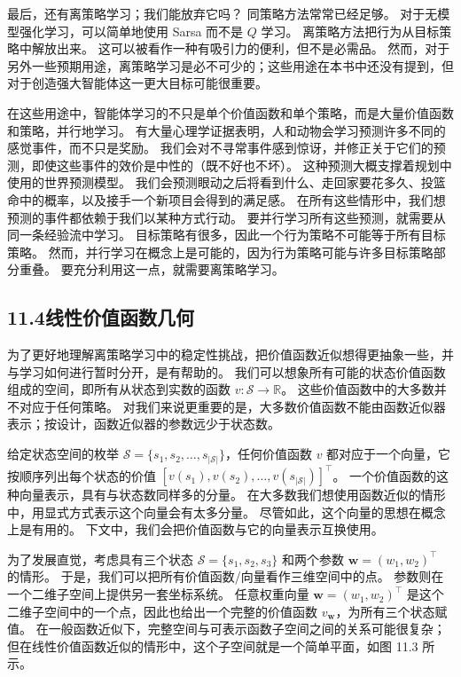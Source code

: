 \documentclass[UTF8,12pt,a4paper,fontset=fandol]{ctexart}
\begin{document}
最后，还有离策略学习；我们能放弃它吗？
同策略方法常常已经足够。
对于无模型强化学习，可以简单地使用 Sarsa 而不是 $Q$ 学习。
离策略方法把行为从目标策略中解放出来。
这可以被看作一种有吸引力的便利，但不是必需品。
然而，对于另外一些预期用途，离策略学习是必不可少的；这些用途在本书中还没有提到，但对于创造强大智能体这一更大目标可能很重要。

在这些用途中，智能体学习的不只是单个价值函数和单个策略，而是大量价值函数和策略，并行地学习。
有大量心理学证据表明，人和动物会学习预测许多不同的感觉事件，而不只是奖励。
我们会对不寻常事件感到惊讶，并修正关于它们的预测，即使这些事件的效价是中性的（既不好也不坏）。
这种预测大概支撑着规划中使用的世界预测模型。
我们会预测眼动之后将看到什么、走回家要花多久、投篮命中的概率，以及接手一个新项目会得到的满足感。
在所有这些情形中，我们想预测的事件都依赖于我们以某种方式行动。
要并行学习所有这些预测，就需要从同一条经验流中学习。
目标策略有很多，因此一个行为策略不可能等于所有目标策略。
然而，并行学习在概念上是可能的，因为行为策略可能与许多目标策略部分重叠。
要充分利用这一点，就需要离策略学习。

\subsection*{11.4\quad 线性价值函数几何}

为了更好地理解离策略学习中的稳定性挑战，把价值函数近似想得更抽象一些，并与学习如何进行暂时分开，是有帮助的。
我们可以想象所有可能的状态价值函数组成的空间，即所有从状态到实数的函数 $v:\mathcal{S}\to\mathbb{R}$。
这些价值函数中的大多数并不对应于任何策略。
对我们来说更重要的是，大多数价值函数不能由函数近似器表示；按设计，函数近似器的参数远少于状态数。

给定状态空间的枚举 $\mathcal{S}=\{s_1,s_2,\ldots,s_{|\mathcal{S}|}\}$，任何价值函数 $v$ 都对应于一个向量，它按顺序列出每个状态的价值
$[v(s_1),v(s_2),\ldots,v(s_{|\mathcal{S}|})]^\top$。
一个价值函数的这种向量表示，具有与状态数同样多的分量。
在大多数我们想使用函数近似的情形中，用显式方式表示这个向量会有太多分量。
尽管如此，这个向量的思想在概念上是有用的。
下文中，我们会把价值函数与它的向量表示互换使用。

为了发展直觉，考虑具有三个状态 $\mathcal{S}=\{s_1,s_2,s_3\}$ 和两个参数 $\mathbf{w}=(w_1,w_2)^\top$ 的情形。
于是，我们可以把所有价值函数/向量看作三维空间中的点。
参数则在一个二维子空间上提供另一套坐标系统。
任意权重向量 $\mathbf{w}=(w_1,w_2)^\top$ 是这个二维子空间中的一个点，因此也给出一个完整的价值函数 $v_{\mathbf{w}}$，为所有三个状态赋值。
在一般函数近似下，完整空间与可表示函数子空间之间的关系可能很复杂；但在线性价值函数近似的情形中，这个子空间就是一个简单平面，如图 11.3 所示。
\end{document}
